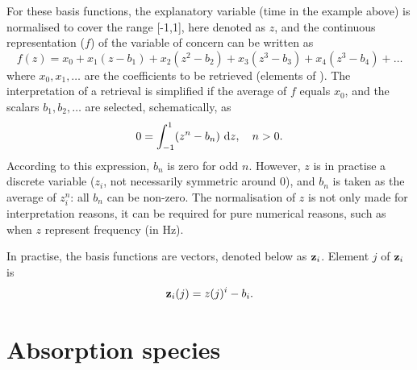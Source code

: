 For these basis functions, the explanatory variable (time in the example above)
is normalised to cover the range [-1,1], here denoted as $z$, and the
continuous representation ($f$) of the variable of concern can be written as
\begin{equation}
  f(z) = x_0 + x_1(z-b_1) + x_2(z^2-b_2) + x_3(z^3-b_3) + x_4(z^3-b_4) + \dots  
\end{equation}
where $x_0, x_1, \dots$ are the coefficients to be retrieved (elements of
\SttVct). The interpretation of a retrieval is simplified if the average of $f$
equals $x_0$, and the scalars $b_1, b_2, \dots$ are selected, schematically, as
\begin{equation}
  0 = \int_{-1}^1 \!\left(z^n-b_n\right) \, \mathrm{d} z, \quad n>0.
\end{equation}
According to this expression, $b_n$ is zero for odd $n$. However, $z$ is in
practise a discrete variable ($z_i$, not necessarily symmetric around 0), and
$b_n$ is taken as the average of $z_i^n$: all $b_n$ can be non-zero. The
normalisation of $z$ is not only made for interpretation reasons, it can be
required for pure numerical reasons, such as when $z$ represent frequency (in
Hz).

In practise, the basis functions are vectors, denoted below as $\mathbf{z}_i$.
Element $j$ of $\mathbf{z}_i$ is
\begin{equation}
  \mathbf{z}_i(j) = z(j)^i - b_i.
\end{equation}





\section{Absorption species}
\label{sec:wfuns:absspecies}


